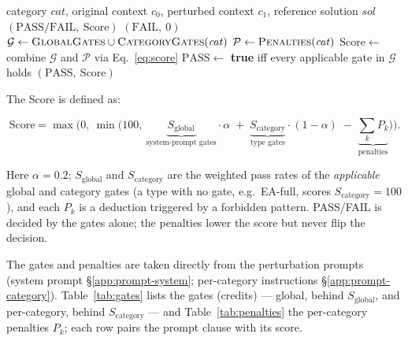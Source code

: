 \documentclass[10pt]{article}
\begin{document}
\begin{algorithm}[!h]
\caption{Stage~1 deterministic validation for one candidate.}
\label{alg:stage1}
\begin{algorithmic}[1]
\Require category $\mathit{cat}$, original context $c_0$, perturbed context $c_1$, reference solution $\mathit{sol}$
\Ensure $(\mathrm{PASS}/\mathrm{FAIL},\ \mathrm{Score})$
  \State \Return $(\mathrm{FAIL},\ 0)$ 
\EndIf
\State $\mathcal{G} \gets \textsc{GlobalGates} \cup \textsc{CategoryGates}(\mathit{cat})$ 
\State $\mathcal{P} \gets \textsc{Penalties}(\mathit{cat})$ 
\State $\mathrm{Score} \gets$ combine $\mathcal{G}$ and $\mathcal{P}$ via Eq.~\eqref{eq:score} 
\State $\mathrm{PASS} \gets$ \textbf{true} iff every applicable gate in $\mathcal{G}$ holds 
\State \Return $(\mathrm{PASS},\ \mathrm{Score})$
\end{algorithmic}
\end{algorithm}

The Score is defined as:

\begin{equation}
\label{eq:score}
\mathrm{Score}=\max\!\Big(0,\ \min\!\big(100,\
\underbrace{S_{\mathrm{global}}}_{\text{system-prompt gates}}\!\cdot\alpha
\;+\;
\underbrace{S_{\mathrm{category}}}_{\text{type gates}}\!\cdot(1-\alpha)
\;-\;
\underbrace{\textstyle\sum_{k} P_k}_{\text{penalties}}\big)\Big).
\end{equation}

Here $\alpha=0.2$; $S_{\mathrm{global}}$ and $S_{\mathrm{category}}$ are the weighted pass rates of the \emph{applicable} global and category gates (a type with no gate, e.g.\ EA-full, scores $S_{\mathrm{category}}{=}100$), and each $P_k$ is a deduction triggered by a forbidden pattern. PASS/FAIL is decided by the gates alone; the penalties lower the score but never flip the decision.

The gates and penalties are taken directly from the perturbation prompts (system prompt \S\ref{app:prompt-system}; per-category instructions \S\ref{app:prompt-category}). Table~\ref{tab:gates} lists the gates (credits) --- global, behind $S_{\mathrm{global}}$, and per-category, behind $S_{\mathrm{category}}$ --- and Table~\ref{tab:penalties} the per-category penalties $P_k$; each row pairs the prompt clause with its score.
\end{document}
